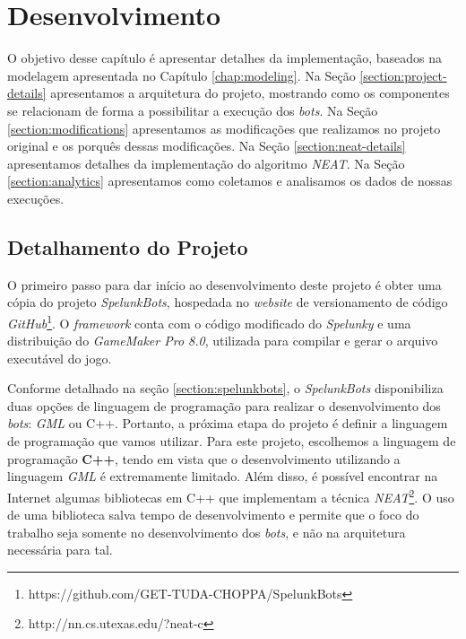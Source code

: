 \chapter{\label{chap:development}Desenvolvimento}

O objetivo desse capítulo é apresentar detalhes da implementação, baseados na
modelagem apresentada no Capítulo \ref{chap:modeling}. Na Seção
\ref{section:project-details} apresentamos a arquitetura do projeto, mostrando
como os componentes se relacionam de forma a possibilitar a execução dos
\textit{bots}. Na Seção \ref{section:modifications} apresentamos as
modificações que realizamos no projeto original e os porquês dessas
modificações. Na Seção \ref{section:neat-details} apresentamos detalhes da
implementação do algoritmo \textit{NEAT}. Na Seção \ref{section:analytics}
apresentamos como coletamos e analisamos os dados de nossas execuções.

\section{\label{section:project-details}Detalhamento do Projeto}
O primeiro passo para dar início ao desenvolvimento deste projeto é obter uma
cópia do projeto \textit{SpelunkBots}, hospedada no \textit{website} de
versionamento de código
\textit{GitHub}\footnote{https://github.com/GET-TUDA-CHOPPA/SpelunkBots}. O
\textit{framework} conta com o código modificado do \textit{Spelunky} e uma
distribuição do \textit{GameMaker Pro 8.0}, utilizada para compilar e gerar o
arquivo executável do jogo.

Conforme detalhado na seção \ref{section:spelunkbots}, o \textit{SpelunkBots}
disponibiliza duas opções de linguagem de programação para realizar o
desenvolvimento dos \textit{bots}: \textit{GML} ou C++. Portanto, a próxima
etapa do projeto é definir a linguagem de programação que vamos utilizar. Para
este projeto, escolhemos a linguagem de programação \textbf{C++}, tendo em vista
que o desenvolvimento utilizando a linguagem \textit{GML} é extremamente
limitado. Além disso, é possível encontrar na Internet algumas bibliotecas em
C++ que implementam a técnica
\textit{NEAT}\footnote{http://nn.cs.utexas.edu/?neat-c}. O uso de uma biblioteca
salva tempo de desenvolvimento e permite que o foco do trabalho seja somente no
desenvolvimento dos \textit{bots}, e não na arquitetura necessária para tal.

